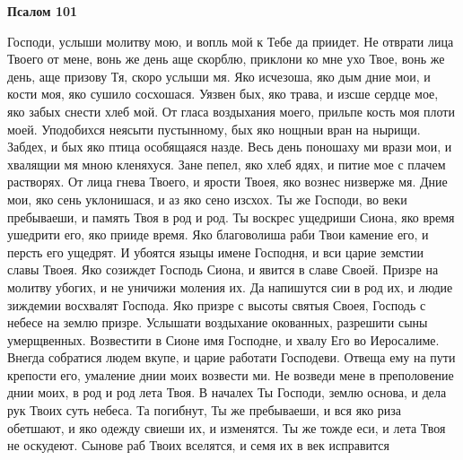 \bfseries Псалом 101\normalfont{}


Господи, услыши молитву мою, и вопль мой к Тебе да приидет. Не отврати лица Твоего от мене, вонь же день аще скорблю, приклони ко мне ухо Твое, вонь же день, аще призову Тя, скоро услыши мя. Яко исчезоша, яко дым дние мои, и кости моя, яко сушило сосхошася. Уязвен бых, яко трава, и изсше сердце мое, яко забых снести хлеб мой. От гласа воздыхания моего, прильпе кость моя плоти моей. Уподобихся неясыти пустынному, бых яко нощныи вран на нырищи. Забдех, и бых яко птица особящаяся назде. Весь день поношаху ми врази мои, и хвалящии мя мною кленяхуся. Зане пепел, яко хлеб ядях, и питие мое с плачем растворях. От лица гнева Твоего, и ярости Твоея, яко вознес низверже мя. Дние мои, яко сень уклонишася, и аз яко сено изсхох. Ты же Господи, во веки пребываеши, и память Твоя в род и род. Ты воскрес ущедриши Сиона, яко время ушедрити его, яко прииде время. Яко благоволиша раби Твои камение его, и персть его ущедрят. И убоятся языцы имене Господня, и вси царие земстии славы Твоея. Яко созиждет Господь Сиона, и явится в славе Своей. Призре на молитву убогих, и не уничижи моления их. Да напишутся сии в род их, и людие зиждемии восхвалят Господа. Яко призре с высоты святыя Своея, Господь с небесе на землю призре. Услышати воздыхание окованных, разрешити сыны умерщвенных. Возвестити в Сионе имя Господне, и хвалу Его во Иеросалиме. Внегда собратися людем вкупе, и царие работати Господеви. Отвеща ему на пути крепости его, умаление днии моих возвести ми. Не возведи мене в преполовение днии моих, в род и род лета Твоя. В началех Ты Господи, землю основа, и дела рук Твоих суть небеса. Та погибнут, Ты же пребываеши, и вся яко риза обетшают, и яко одежду свиеши их, и изменятся. Ты же тожде еси, и лета Твоя не оскудеют. Сынове раб Твоих вселятся, и семя их в век исправится


